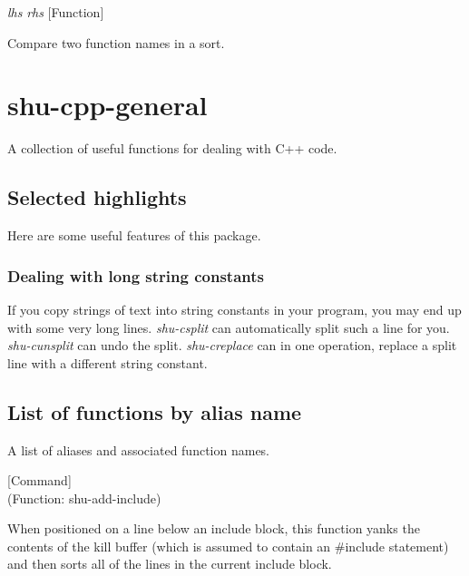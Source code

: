 \vspace{1em}
\noindent
{}
\usebox{\funcname}\emph{lhs} \emph{rhs}
 \hfill [Function]

\begin{doc-string}
Compare two function names in a sort.
\end{doc-string}

\eject
\section{shu-cpp-general}


A collection of useful functions for dealing with C++ code.

\subsection{Selected highlights}

Here are some useful features of this package.

\subsubsection{Dealing with long string constants}

If you copy strings of text into string constants in your program, you may end up
with some very long lines.  \emph{shu-csplit} can automatically split such a line
for you.  \emph{shu-cunsplit} can undo the split.  \emph{shu-creplace} can in one
operation, replace a split line with a different string constant.



\subsection{List of functions by alias name}

A list of aliases and associated function names.



\vspace{1em}
\noindent
{}
\usebox{\funcname}
 \hfill [Command]\\%
 (Function: shu-add-include)

\begin{doc-string}
When positioned on a line below an include block, this function yanks the
contents of the kill buffer (which is assumed to contain an \#include statement)
and then sorts all of the lines in the current include block.
\end{doc-string}

